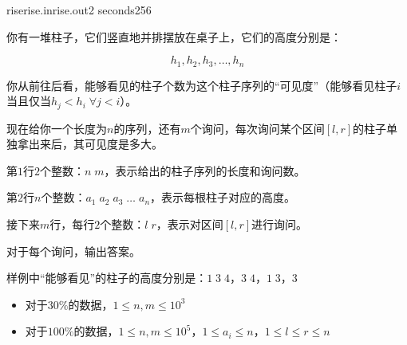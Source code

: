 \documentclass[11pt,a4paper,oneside]{article}
\begin{document}
\begin{problem}{rise}{rise.in}{rise.out}{2 seconds}{256}
	
	你有一堆柱子，它们竖直地并排摆放在桌子上，它们的高度分别是：
	
	$$
		h_1, h_2, h_3, \dots, h_n
	$$
	
	你从前往后看，能够看见的柱子个数为这个柱子序列的“可见度”（能够看见柱子$i$当且仅当$h_j < h_i \; \forall   j < i$）。
	
	现在给你一个长度为$n$的序列，还有$m$个询问，每次询问某个区间$[l,r]$的柱子单独拿出来后，其可见度是多大。
	
	\InputFile
	
	第$1$行$2$个整数：$n \; m$，表示给出的柱子序列的长度和询问数。
	
	第$2$行$n$个整数：$a_1 \; a_2 \; a_3 \; \dots \; a_n$，表示每根柱子对应的高度。
	
	接下来$m$行，每行$2$个整数：$l \; r$，表示对区间$[l,r]$进行询问。
	
	\OutputFile

	对于每个询问，输出答案。

	\Example
	
	\begin{example}
\end{example}

	样例中“能够看见”的柱子的高度分别是：$1 \; 3 \; 4$，$　3 \; 4$，$1 \; 3 $，$ 3 $
	
\Note
	\begin{itemize}
		\item 对于$30\%$的数据，$ 1 \leq n, m \leq 10^3 $
		\item 对于$100\%$的数据，$ 1 \leq n, m \leq 10^5 $，$1 \leq a_i \leq n$，$ 1 \leq l \leq r \leq n $
	\end{itemize}
	
\end{problem}
\end{document}
